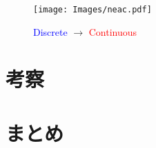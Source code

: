 \documentclass[a0, 30pt, plainboxedsections]{sciposter} %
\begin{document}
\begin{multicols}{2}
\begin{figure}[H]
  \begin{center}
	\texttt{[image: Images/neac.pdf]}
	{\small\caption{{\textcolor{blue}{Discrete}} $\rightarrow$ {\textcolor{red}{Continuous}}}}
  \end{center}
\end{figure}

\section*{\huge{考察}}

\section*{\huge{まとめ}}

\end{multicols}


\end{document}
